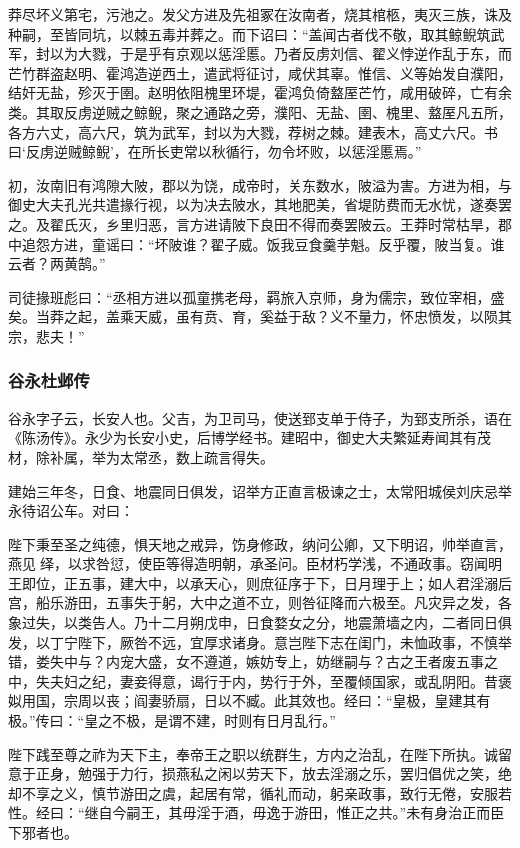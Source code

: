 \documentclass[]{article}
\begin{document}
莽尽坏义第宅，污池之。发父方进及先祖冢在汝南者，烧其棺柩，夷灭三族，诛及种嗣，至皆同坑，以棘五毒并葬之。而下诏曰：``盖闻古者伐不敬，取其鲸鲵筑武军，封以为大戮，于是乎有京观以惩淫慝。乃者反虏刘信、翟义悖逆作乱于东，而芒竹群盗赵明、霍鸿造逆西土，遣武将征讨，咸伏其辜。惟信、义等始发自濮阳，结奸无盐，殄灭于圉。赵明依阻槐里环堤，霍鸿负倚盩厔芒竹，咸用破碎，亡有余类。其取反虏逆贼之鲸鲵，聚之通路之旁，濮阳、无盐、圉、槐里、盩厔凡五所，各方六丈，高六尺，筑为武军，封以为大戮，荐树之棘。建表木，高丈六尺。书曰`反虏逆贼鲸鲵'，在所长吏常以秋循行，勿令坏败，以惩淫慝焉。''

初，汝南旧有鸿隙大陂，郡以为饶，成帝时，关东数水，陂溢为害。方进为相，与御史大夫孔光共遣掾行视，以为决去陂水，其地肥美，省堤防费而无水忧，遂奏罢之。及翟氏灭，乡里归恶，言方进请陂下良田不得而奏罢陂云。王莽时常枯旱，郡中追怨方进，童谣曰：``坏陂谁？翟子威。饭我豆食羹芋魁。反乎覆，陂当复。谁云者？两黄鹄。''

司徒掾班彪曰：``丞相方进以孤童携老母，羁旅入京师，身为儒宗，致位宰相，盛矣。当莽之起，盖乘天威，虽有贲、育，奚益于敌？义不量力，怀忠愤发，以陨其宗，悲夫！''

\hypertarget{header-n5761}{%
\subsubsection{谷永杜邺传}\label{header-n5761}}

谷永字子云，长安人也。父吉，为卫司马，使送郅支单于侍子，为郅支所杀，语在《陈汤传》。永少为长安小史，后博学经书。建昭中，御史大夫繁延寿闻其有茂材，除补属，举为太常丞，数上疏言得失。

建始三年冬，日食、地震同日俱发，诏举方正直言极谏之士，太常阳城侯刘庆忌举永待诏公车。对曰：

陛下秉至圣之纯德，惧天地之戒异，饬身修政，纳问公卿，又下明诏，帅举直言，燕见绎，以求咎愆，使臣等得造明朝，承圣问。臣材朽学浅，不通政事。窃闻明王即位，正五事，建大中，以承天心，则庶征序于下，日月理于上；如人君淫溺后宫，船乐游田，五事失于躬，大中之道不立，则咎征降而六极至。凡灾异之发，各象过失，以类告人。乃十二月朔戊申，日食婺女之分，地震萧墙之内，二者同日俱发，以丁宁陛下，厥咎不远，宜厚求诸身。意岂陛下志在闺门，未恤政事，不慎举错，娄失中与？内宠大盛，女不遵道，嫉妨专上，妨继嗣与？古之王者废五事之中，失夫妇之纪，妻妾得意，谒行于内，势行于外，至覆倾国家，或乱阴阳。昔褒姒用国，宗周以丧；阎妻骄扇，日以不臧。此其效也。经曰：``皇极，皇建其有极。''传曰：``皇之不极，是谓不建，时则有日月乱行。''

陛下践至尊之祚为天下主，奉帝王之职以统群生，方内之治乱，在陛下所执。诚留意于正身，勉强于力行，损燕私之闲以劳天下，放去淫溺之乐，罢归倡优之笑，绝却不享之义，慎节游田之虞，起居有常，循礼而动，躬亲政事，致行无倦，安服若性。经曰：``继自今嗣王，其毋淫于酒，毋逸于游田，惟正之共。''未有身治正而臣下邪者也。
\end{document}
